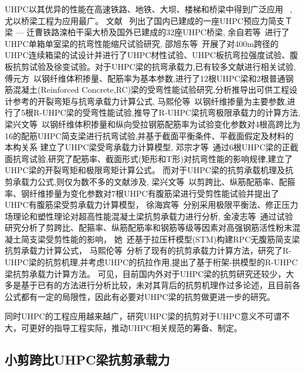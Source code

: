 \documentclass[a4paper,11pt]{article}
\begin{document}
\begin{mybox}
\indent UHPC以其优异的性能在高速铁路、地铁、大坝、楼梯和桥梁中得到广泛应用
~\cite{王德辉2016超高性能混凝土在中国的研究和应用},尤以桥梁工程为应用最广。
文献~\parencite{杜任远2013活性粉末混凝土桥梁应用与研究}
列出了国内已建成的一座UHPC预应力简支Ｔ梁 --- 迁曹铁路滦柏干渠大桥及国外已建成的32座UHPC桥梁,
余自若等~\cite{余自若2004铁路}进行了UHPC单箱单室梁的抗弯性能缩尺试验研究,
邵旭东等~\cite{邵旭东2013超大跨径单向预应力}开展了对400m跨径的UHPC连续箱梁的试设计并进行了UHPC材性试验、UHPC板抗弯拉强度试验、腹板抗剪试验及徐变试验。对于UHPC梁的抗弯承载力,已有较多文献进行相关试验,
傅元方~\cite{傅元方2016UHPC}以钢纤维体积掺量、配筋率为基本参数,进行了12根UHPC梁和2根普通钢筋混凝土(Reinforced Concrete,RC)梁的受弯性能试验研究,分析推导出可供工程设计参考的开裂弯矩与抗弯承载力计算公式,
马熙伦等~\cite{2019钢纤维掺量对}以钢纤维掺量为主要参数,进行了5根R-UHPC梁的受弯性能试验,推导了R-UHPC梁抗弯极限承载力的计算方法,
梁兴文等~\cite{2019配筋超高性能混凝土梁受弯性能及承载力研究}以钢纤维体积掺量和纵向受拉钢筋配筋率为试验变化参数对4根高跨比为16的配筋UHPC简支梁进行抗弯试验,并基于截面平衡条件、平截面假定及材料的本构关系
建立了UHPC梁受弯承载力计算模型,
邓宗才等~\cite{邓宗才2015高强钢筋}通过6根UHPC梁的正截面抗弯试验,研究了配筋率、截面形式(矩形和T形)对抗弯性能的影响规律,建立了UHPC梁的开裂弯矩和极限弯矩计算公式。
而对于UHPC梁的抗剪承载机理及抗剪承载力公式,则仅为数不多的文献涉及,
梁兴文等~\cite{2018超高性能混凝土有腹筋梁受剪性能及受剪承载力研究}以剪跨比、纵筋配筋率、配箍率、钢纤维掺量为变化参数对7根UHPC有腹筋梁进行受剪性能试验并提出了UHPC有腹筋梁受剪承载力计算模型，
徐海宾等~\cite{徐海宾2015超高性能混凝土梁抗剪承载力计算方法}分别采用极限平衡法、修正压力场理论和塑性理论对超高性能混凝土梁抗剪承载力进行分析,
金凌志等~\cite{金凌志2013高强钢筋活性粉末混凝土简支梁受剪性能试验研究}通过试验研究分析了剪跨比、配箍率、纵筋配筋率和钢筋等级等因素对高强钢筋活性粉末混凝土简支梁受剪性能的影响，
她~\cite{金凌志2015拉}还基于拉压杆模型(STM)构建RPC无腹筋简支梁抗剪承载力计算公式，
马熙伦等~\cite{马熙伦2017r}分析了现有的抗剪承载力计算方法，研究了R-UHPC梁的抗剪机理,并考虑UHPC的抗拉作用,提出了基于桁架-拱模型的R-UHPC梁抗剪承载力计算方法。
可见，目前国内外对于UHPC梁的抗剪研究还较少，大多是基于已有的方法进行分析比较，未对其背后的抗剪机理作过多论述，且目前各公式都有一定的局限性，因此有必要对UHPC梁的抗剪做更进一步的研究。

\indent 同时UHPC的工程应用越来越广，研究UHPC梁的抗剪对于UHPC意义不可谓不大，可更好的指导工程实际，推动UHPC相关规范的筹备、制定。

\subsection{小剪跨比UHPC梁抗剪承载力}


\end{mybox}
\end{document}
